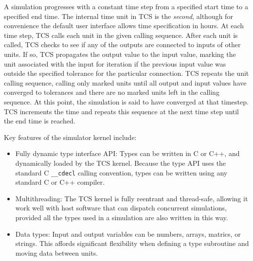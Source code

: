 \documentclass{article}
\begin{document}
A simulation progresses with a constant time step from a specified start time to a specified end time.  The internal time unit in TCS is the \emph{second}, although for convenience the default user interface allows time specification in hours.  At each time step, TCS calls each unit in the given calling sequence.  After each unit is called, TCS checks to see if any of the outputs are connected to inputs of other units.  If so, TCS propagates the output value to the input value, marking the unit associated with the input for iteration if the previous input value was outside the specified tolerance for the particular connection.  TCS repeats the unit calling sequence, calling only marked units until all output and input values have converged to tolerances and there are no marked units left in the calling sequence.  At this point, the simulation is said to have converged at that timestep.  TCS increments the time and repeats this sequence at the next time step until the end time is reached.

Key features of the simulator kernel include:
\begin{itemize}
\item Fully dynamic type interface API:  Types can be written in C or C++, and dynamically loaded by the TCS kernel.  Because the type API uses the standard C \texttt{\_\_cdecl} calling convention, types can be written using any standard C or C++ compiler.
\item Multithreading: The TCS kernel is fully reentrant and thread-safe, allowing it work well with host software that can dispatch concurrent simulations, provided all the types used in a simulation are also written in this way.
\item Data types:  Input and output variables can be numbers, arrays, matrics, or strings.  This affords significant flexibility when defining a type subroutine and moving data between units.
\end{itemize}
\end{document}
